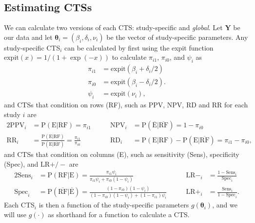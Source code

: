 \documentclass[AMA,STIX1COL]{WileyNJD-v2}
\newcommand{\E}{\mbox{E}}
\newcommand{\RF}{\mbox{RF}}
\newcommand{\Ebar}{\overline{\mbox{E}}}
\newcommand{\RFbar}{\overline{\mbox{RF}}}
\newcommand{\boldtheta}{\boldsymbol{\theta}}
\begin{document}
\subsection{Estimating CTSs} \label{sec:CTSs}

We can calculate two versions of each CTS: study-specific and \textit{global}. Let $\boldsymbol{Y}$ be our data and let $\boldtheta_i = (\beta_i, \delta_i, \nu_i)$ be the vector of study-specific parameters. Any study-specific CTS$_i$ can be calculated by first using the expit function $\mbox{expit}(x) = 1 / (1 + \exp(-x))$ to calculate $\pi_{i1}$, $\pi_{i0}$, and $\psi_i$ as
\begin{align}
\pi_{i1} &= \mbox{expit}(\beta_i + \delta_i / 2) \nonumber \\
\pi_{i0} &= \mbox{expit}(\beta_i - \delta_i / 2). \nonumber \\
\psi_i &= \mbox{expit}(\nu_i), \nonumber
\end{align}
and CTSs that condition on rows (RF), such as PPV, NPV, RD and RR for each study $i$ are
\begin{alignat}{2}
\mbox{PPV}_i &= \mbox{P}(\E \vert \RF) = \pi_{i1}   \qquad &\mbox{NPV}_i &= \mbox{P}(\Ebar \vert \RFbar) = 1 - \pi_{i0} \nonumber \\
\mbox{RR}_i &= \frac{\mbox{P}(\E \vert \RF)}{\mbox{P}(\E \vert \RFbar)} = \frac{\pi_{i1}}{\pi_{i0}}  \qquad &\mbox{RD}_i &= \mbox{P}(\E \vert \RF) - \mbox{P}(\E \vert \RFbar) = \pi_{i1} - \pi_{i0} , \nonumber
\end{alignat}
\noindent and CTSs that condition on columns (E), such as sensitivity (Sens), specificity (Spec), and LR$+/-$ are
\begin{alignat}{2}
\mbox{Sens}_i &= \mbox{P}(\RF \vert \E) = \frac{\pi_{i1} \psi_i}{\pi_{i1}\psi_i + \pi_{i0}(1 - \psi_i)} \qquad &  \mbox{LR}-_i &= \frac{1 - \mbox{Sens}_i}{\mbox{Spec}_i} \nonumber \\
\mbox{Spec}_i &= \mbox{P}(\RFbar \vert \Ebar) = \frac{(1 - \pi_{i0})(1 - \psi_i)}{(1 - \pi_{i0}) (1 - \psi_i) + (1 - \pi_{i1}) \psi_i} \qquad & \mbox{LR}+_i &= \frac{\mbox{Sens}_i}{1 - \mbox{Spec}_i}.\nonumber  \nonumber
\end{alignat}
\noindent Each CTS$_i$ is then a function of the study-specific parameters $g(\boldtheta_i)$, and we will use $g(\cdot)$ as shorthand for a function to calculate a CTS. 
\end{document}
